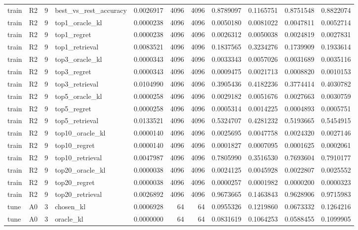 \begin{tabular}{llrlrrrrrrr}
train & R2 & 9 & best_vs_rest_accuracy & 0.0026917 & 4096 & 4096 & 0.8789097 & 0.1165751 & 0.8751548 & 0.8822074 \\
train & R2 & 9 & top1_oracle_kl & 0.0000238 & 4096 & 4096 & 0.0050180 & 0.0081022 & 0.0047811 & 0.0052714 \\
train & R2 & 9 & top1_regret & 0.0000238 & 4096 & 4096 & 0.0026312 & 0.0050038 & 0.0024819 & 0.0027831 \\
train & R2 & 9 & top1_retrieval & 0.0083521 & 4096 & 4096 & 0.1837565 & 0.3234276 & 0.1739909 & 0.1933614 \\
train & R2 & 9 & top3_oracle_kl & 0.0000343 & 4096 & 4096 & 0.0033343 & 0.0057026 & 0.0031689 & 0.0035116 \\
train & R2 & 9 & top3_regret & 0.0000343 & 4096 & 4096 & 0.0009475 & 0.0021713 & 0.0008820 & 0.0010153 \\
train & R2 & 9 & top3_retrieval & 0.0104990 & 4096 & 4096 & 0.3905436 & 0.4182236 & 0.3774414 & 0.4030782 \\
train & R2 & 9 & top5_oracle_kl & 0.0000258 & 4096 & 4096 & 0.0029182 & 0.0051676 & 0.0027663 & 0.0030759 \\
train & R2 & 9 & top5_regret & 0.0000258 & 4096 & 4096 & 0.0005314 & 0.0014225 & 0.0004893 & 0.0005751 \\
train & R2 & 9 & top5_retrieval & 0.0133521 & 4096 & 4096 & 0.5324707 & 0.4281232 & 0.5193665 & 0.5454915 \\
train & R2 & 9 & top10_oracle_kl & 0.0000140 & 4096 & 4096 & 0.0025695 & 0.0047758 & 0.0024320 & 0.0027146 \\
train & R2 & 9 & top10_regret & 0.0000140 & 4096 & 4096 & 0.0001827 & 0.0007095 & 0.0001625 & 0.0002061 \\
train & R2 & 9 & top10_retrieval & 0.0047987 & 4096 & 4096 & 0.7805990 & 0.3516530 & 0.7693604 & 0.7910177 \\
train & R2 & 9 & top20_oracle_kl & 0.0000038 & 4096 & 4096 & 0.0024125 & 0.0045928 & 0.0022807 & 0.0025552 \\
train & R2 & 9 & top20_regret & 0.0000038 & 4096 & 4096 & 0.0000257 & 0.0001982 & 0.0000200 & 0.0000323 \\
train & R2 & 9 & top20_retrieval & 0.0026892 & 4096 & 4096 & 0.9673665 & 0.1463843 & 0.9628906 & 0.9715983 \\
tune & A0 & 3 & chosen_kl & 0.0006928 & 64 & 64 & 0.0955326 & 0.1219860 & 0.0673332 & 0.1264216 \\
tune & A0 & 3 & oracle_kl & 0.0000000 & 64 & 64 & 0.0831619 & 0.1064253 & 0.0588455 & 0.1099905 \\

\end{tabular}
